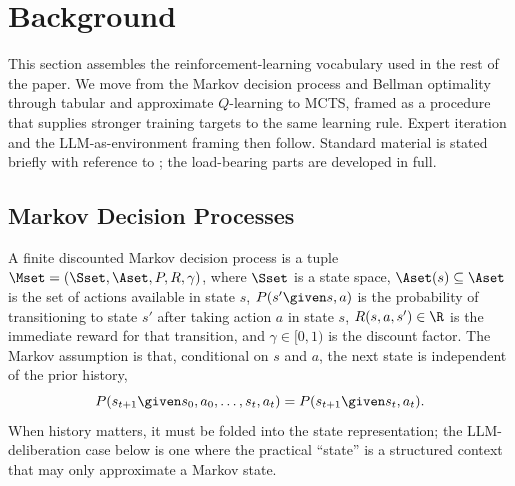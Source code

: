 \section{Background}
\label{sec:background}


This section assembles the reinforcement-learning vocabulary used in the
rest of the paper. We move from the Markov decision process and Bellman
optimality through tabular and approximate $Q$-learning to MCTS, framed
as a procedure that supplies stronger training targets to the same
learning rule. Expert iteration and the LLM-as-environment framing then
follow. Standard material is stated briefly with reference to
\citet{sutton2018reinforcement}; the load-bearing parts are developed in
full.

\subsection{Markov Decision Processes}
\label{sec:background-mdp}

A finite discounted Markov decision process is a tuple
$\Mset = (\Sset, \Aset, P, R, \gamma)$, where $\Sset$ is a state space,
$\Aset(s) \subseteq \Aset$ is the set of actions available in state $s$,
$P(s' \given s, a)$ is the probability of transitioning to state $s'$ after
taking action $a$ in state $s$, $R(s, a, s') \in \R$ is the immediate reward
for that transition, and $\gamma \in [0, 1)$ is the discount factor. The
Markov assumption is that, conditional on $s$ and $a$, the next state is
independent of the prior history,
\begin{equation}
P(s_{t+1} \given s_0, a_0, \ldots, s_t, a_t) = P(s_{t+1} \given s_t, a_t).
\label{eq:markov}
\end{equation}
When history matters, it must be folded into the state representation; the
LLM-deliberation case below is one where the practical ``state'' is a
structured context that may only approximate a Markov state.

